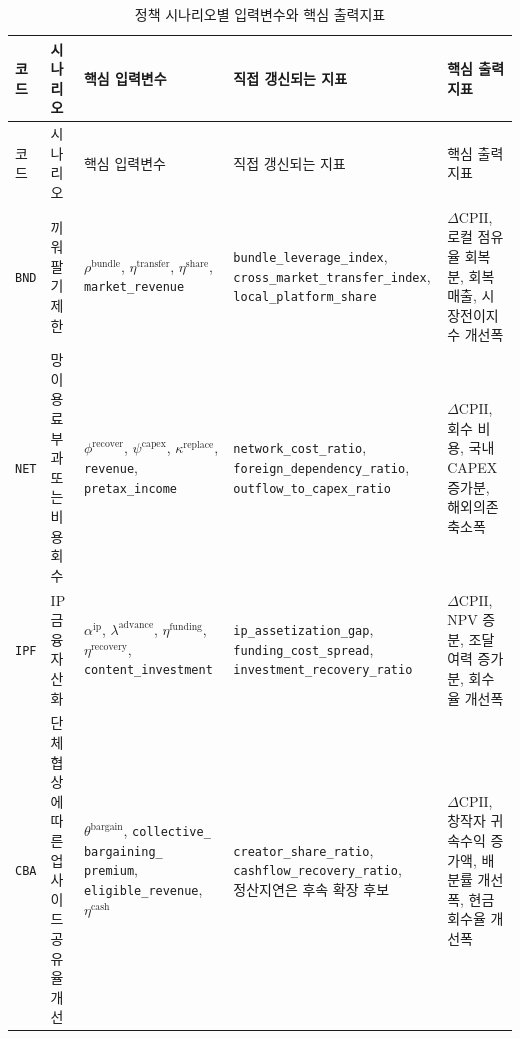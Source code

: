 \documentclass[11pt,a4paper]{report}
\newcommand{\WrapCell}[1]{\parbox[t]{\hsize}{\RaggedRight #1}}
\begin{document}
\begin{landscape}
\footnotesize
\setlength{\tabcolsep}{2.5pt}
\begin{longtable}{@{}L{1.5cm}L{3.6cm}L{4.6cm}L{4.7cm}L{4.5cm}@{}}
\caption{정책 시나리오별 입력변수와 핵심 출력지표} \\
\toprule
{}
코드 & 시나리오 & 핵심 입력변수 & 직접 갱신되는 지표 & 핵심 출력지표 \\
\midrule
\endfirsthead
\toprule
{}
코드 & 시나리오 & 핵심 입력변수 & 직접 갱신되는 지표 & 핵심 출력지표 \\
\midrule
\endhead
\texttt{BND} & 끼워팔기 제한 & \WrapCell{$\rho^{\mathrm{bundle}}$, $\eta^{\mathrm{transfer}}$, $\eta^{\mathrm{share}}$,\\\texttt{market\_revenue}} & \WrapCell{\texttt{bundle\_leverage\_index},\\\nolinkurl{cross_market_transfer_index},\\\texttt{local\_platform\_share}} & \WrapCell{$\Delta \mathrm{CPII}$, 로컬 점유율 회복분,\\회복 매출, 시장전이지수 개선폭} \\
\texttt{NET} & 망 이용료 부과 또는 비용 회수 & \WrapCell{$\phi^{\mathrm{recover}}$, $\psi^{\mathrm{capex}}$, $\kappa^{\mathrm{replace}}$,\\\texttt{revenue}, \texttt{pretax\_income}} & \WrapCell{\texttt{network\_cost\_ratio}, \texttt{foreign\_dependency\_ratio},\\\texttt{outflow\_to\_capex\_ratio}} & \WrapCell{$\Delta \mathrm{CPII}$, 회수 비용,\\국내 CAPEX 증가분, 해외의존 축소폭} \\
\texttt{IPF} & IP 금융 자산화 & \WrapCell{$\alpha^{\mathrm{ip}}$, $\lambda^{\mathrm{advance}}$, $\eta^{\mathrm{funding}}$,\\$\eta^{\mathrm{recovery}}$, \texttt{content\_investment}} & \WrapCell{\texttt{ip\_assetization\_gap}, \texttt{funding\_cost\_spread},\\\texttt{investment\_recovery\_ratio}} & \WrapCell{$\Delta \mathrm{CPII}$, NPV 증분,\\조달여력 증가분, 회수율 개선폭} \\
\texttt{CBA} & 단체 협상에 따른 업사이드 공유율 개선 & \WrapCell{$\theta^{\mathrm{bargain}}$,\\\texttt{collective\_}\\\texttt{bargaining\_}\\\texttt{premium},\\\texttt{eligible\_revenue},\\$\eta^{\mathrm{cash}}$} & \WrapCell{\texttt{creator\_share\_ratio},\\\texttt{cashflow\_recovery\_ratio},\\정산지연은 후속 확장 후보} & $\Delta \mathrm{CPII}$, 창작자 귀속수익 증가액, 배분률 개선폭, 현금회수율 개선폭 \\
\bottomrule
\end{longtable}
\end{landscape}
\end{document}
